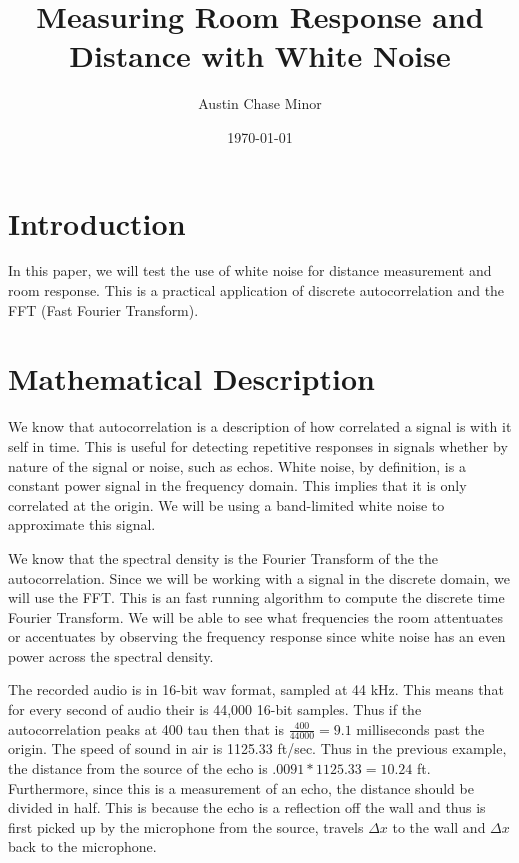 \documentclass{article}
\author{Austin Chase Minor}
\title{Measuring Room Response and Distance with White Noise}
\date{\today}
\begin{document}
   \section{Introduction}
      In this paper, we will test the use of
      white noise for distance measurement and
      room response. This is a practical application
      of discrete autocorrelation and the FFT
      (Fast Fourier Transform).
   \section{Mathematical Description}
      We know that autocorrelation is a description of
      how correlated a signal is with it self in time.
      This is useful for detecting repetitive responses
      in signals whether by nature of the signal or noise,
      such as echos. White noise, by definition, is a constant
      power signal in the frequency domain. This implies that it
      is only correlated at the origin. We will be using a band-limited
      white noise to approximate this signal.

      We know that the spectral density is the Fourier Transform of the
      the autocorrelation. Since we will be working with a signal in the
      discrete domain, we will use the FFT. This is an fast running
      algorithm to compute the discrete time Fourier Transform. We will
      be able to see what frequencies the room attentuates or accentuates
      by observing the frequency response since white noise has an
      even power across the spectral density.

      The recorded audio is in 16-bit wav format, sampled at 44 kHz.
      This means that for every second of audio their is 44,000 16-bit
      samples. Thus if the autocorrelation peaks at 400 tau then
      that is $\frac{400}{44000} = 9.1$ milliseconds past the origin.
      The speed of sound in air is 1125.33 ft/sec. Thus in the previous
      example, the distance from the source
      of the echo is $.0091*1125.33 = 10.24$ ft. Furthermore, since this
      is a measurement of an echo, the distance should be divided in half.
      This is because the echo is a reflection off the wall and thus is first
      picked up by the microphone from the source, travels $\Delta x$ to the
      wall and $\Delta x$ back to the microphone.
\end{document}
